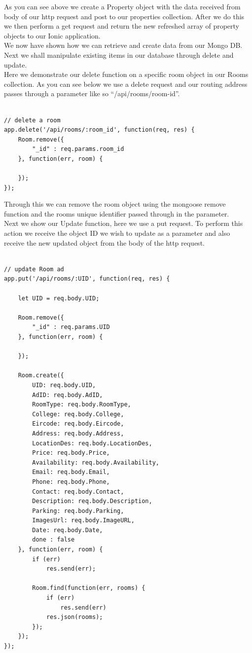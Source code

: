 As you can see above we create a Property object with the data received from body of our http request and post to our properties collection. After we do this we then perform a get request and return the new refreshed array of property objects to our Ionic application.\\


We now have shown how we can retrieve and create data from our Mongo DB. Next we shall manipulate existing items in our database through delete and update.\\


Here we demonstrate our delete function on a specific room object in our Rooms collection. As you can see below we use a delete request and our routing address passes through a parameter like so “/api/rooms/room-id”.\\


\begin{verbatim}

// delete a room
app.delete('/api/rooms/:room_id', function(req, res) {
	Room.remove({
		"_id" : req.params.room_id
	}, function(err, room) {

	});
});

\end{verbatim}


Through this we can remove the room object using the mongoose remove function and the rooms unique identifier passed through in the parameter.\\


Next we show our Update function, here we use a put request. To perform this action we receive the object ID we wish to update as a parameter and also receive the new updated object from the body of the http request.\\


\begin{verbatim}

// update Room ad
app.put('/api/rooms/:UID', function(req, res) {
	
	let UID = req.body.UID;
	
	Room.remove({
		"_id" : req.params.UID
	}, function(err, room) {

	});
	
	Room.create({
		UID: req.body.UID,
		AdID: req.body.AdID,
		RoomType: req.body.RoomType,
		College: req.body.College,
		Eircode: req.body.Eircode,
		Address: req.body.Address,
		LocationDes: req.body.LocationDes,
		Price: req.body.Price,
		Availability: req.body.Availability,
		Email: req.body.Email,
		Phone: req.body.Phone,
		Contact: req.body.Contact,
		Description: req.body.Description,
		Parking: req.body.Parking,
		ImagesUrl: req.body.ImageURL,
		Date: req.body.Date,
		done : false
	}, function(err, room) {
		if (err)
			res.send(err);

		Room.find(function(err, rooms) {
			if (err)
				res.send(err)
			res.json(rooms);
		});
	});
});

\end{verbatim}


